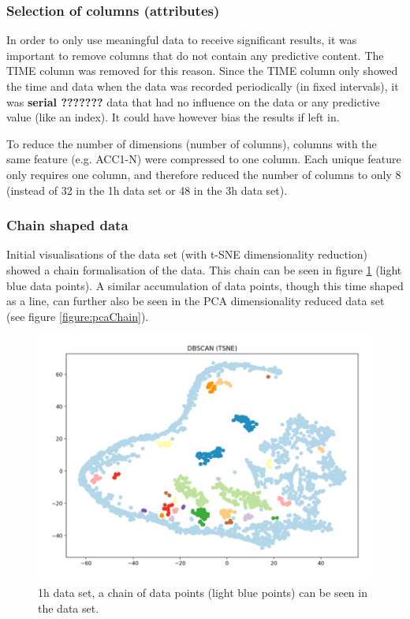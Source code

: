 \subsubsection{Selection of columns (attributes)}
In order to only use meaningful data to receive significant results, it was important to remove columns that do not contain any predictive content. The TIME column was removed for this reason. Since the TIME column only showed the time and data when the data was recorded periodically (in fixed intervals), it was \textbf{serial ???????} data that had no influence on the data or any predictive value (like an index). It could have however bias the results if left in. 

To reduce the number of dimensions (number of columns), columns with the same feature (e.g. ACC1-N) were compressed to one column. Each unique feature only requires one column, and therefore reduced the number of columns to only 8 (instead of 32 in the 1h data set or 48 in the 3h data set).


\subsubsection{Chain shaped data}
Initial visualisations of the data set (with t-SNE dimensionality reduction) showed a chain formalisation of the data. This chain can be seen in figure \ref{figure:tsneChain} (light blue data points). A similar accumulation of data points, though this time shaped as a line, can further also be seen in the PCA dimensionality reduced data set (see figure \ref{figure:pcaChain}). 


\begin{figure}[h]
  \centering
  \includegraphics[width=1\textwidth]{./images/tsneChain.png}
  \caption{1h data set, a chain of data points (light blue points) can be seen in the data set.}
  \label{figure:tsneChain}
\end{figure}


